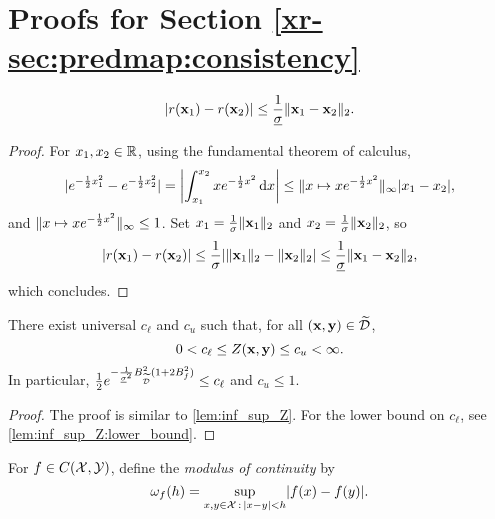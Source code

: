 \documentclass[12pt, twoside]{report}
\newcommand{\xrprefix}[1]{xr-#1}
\begin{document}
\section{Proofs for Section \ref{\xrprefix{sec:predmap:consistency}}}
\label{sec:proofs_predmap:consistency}

\begin{lemma} \label{lem:local_Lipschitzness_r}
    \begin{equation}
        \abs{r(\vx_1) - r(\vx_2)} \le \frac{1}{\underline{\sigma}}\norm{\vx_1 - \vx_2}_2.
    \end{equation}
\end{lemma}
\begin{proof}
    For $x_1, x_2 \in \R$, using the fundamental theorem of calculus,
    \begin{equation}
        \abs{e^{-\frac12 x_1^2} - e^{-\frac12 x_2^2}} = \abs*{
            \int_{x_1}^{x_2} x e^{-\frac12 x^2} \isd x
        }
        \le \norm{x \mapsto x e^{-\frac12 x^2}}_\infty \abs{x_1 - x_2},
    \end{equation}
    and $\norm{x \mapsto x e^{-\frac12 x^2}}_\infty \le 1$.
    Set $x_1 = \frac1{\sigma}\norm{\vx_1}_2$ and $x_2 = \frac1{\sigma}\norm{\vx_2}_2$,
    so
    \begin{equation}
        \abs{r(\vx_1) - r(\vx_2)}
        \le \frac{1}{\sigma} \abs{\norm{\vx_1}_2 - \norm{\vx_2}_2}
        \le \frac{1}{\underline{\sigma}} \norm{\vx_1 - \vx_2}_2,
    \end{equation}
    which concludes.  
\end{proof}

\begin{lemma} \label{lem:bounds_Z}
    There exist universal $c_\ell$ and $c_u$ such that, for all $(\vx, \vy) \in \tD$,
    \begin{equation}
        0
        < c_\ell
        \le Z(\vx, \vy)
        \le c_u
        < \infty.
    \end{equation}
    In particular, $\frac12 e^{-\frac{1}{\underline{\sigma}^2} B_{\tD}^2 (1 + 2 B_f^2)} \le c_\ell$ and $c_u \le 1$.
\end{lemma}
\begin{proof}
    The proof is similar to \cref{lem:inf_sup_Z}.
    For the lower bound on $c_\ell$, see \eqref{lem:inf_sup_Z:lower_bound}.
\end{proof}

For $f \in C(\X, \Y)$, define the \emph{modulus of continuity} by
\begin{equation}
    \omega_f(h)
    = \sup_{x, y \in \X \,:\, \abs{x - y} < h} \abs{f(x) - f(y)}.
\end{equation}
\end{document}
